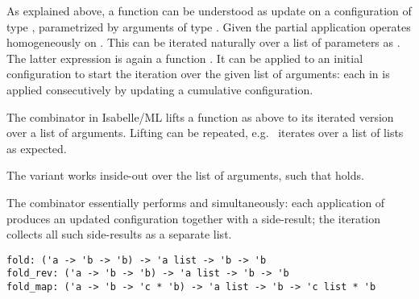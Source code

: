 \begin{isabellebody}
\begin{isamarkuptext}
\end{isamarkuptext}%
\isamarkuptrue%
%
\endisatagmlref
{\isafoldmlref}%
%
\isadelimmlref
%
\endisadelimmlref
%
\isamarkuptrue%
%
\begin{isamarkuptext}%
As explained above, a function  can be
  understood as update on a configuration of type \isa{{\isasymbeta}},
  parametrized by arguments of type \isa{{\isasymalpha}}.  Given 
  the partial application  operates
  homogeneously on \isa{{\isasymbeta}}.  This can be iterated naturally over a
  list of parameters  as .  The latter expression is again a function \isa{{\isasymbeta}\ {\isasymrightarrow}\ {\isasymbeta}}.
  It can be applied to an initial configuration  to
  start the iteration over the given list of arguments: each  in  is applied consecutively by updating a
  cumulative configuration.

  The  combinator in Isabelle/ML lifts a function  as above to its iterated version over a list of arguments.
  Lifting can be repeated, e.g.\  iterates
  over a list of lists as expected.

  The variant  works inside-out over the list of
  arguments, such that  holds.

  The  combinator essentially performs  and  simultaneously: each application of  produces an updated configuration together with a side-result;
  the iteration collects all such side-results as a separate list.%
\end{isamarkuptext}%
\isamarkuptrue%
%
\isadelimmlref
%
\endisadelimmlref
%
\isatagmlref
%
\begin{isamarkuptext}%
\begin{mldecls}
  \verb|fold: ('a -> 'b -> 'b) -> 'a list -> 'b -> 'b| \\
  \verb|fold_rev: ('a -> 'b -> 'b) -> 'a list -> 'b -> 'b| \\
  \verb|fold_map: ('a -> 'b -> 'c * 'b) -> 'a list -> 'b -> 'c list * 'b| \\
  \end{mldecls}


\end{isamarkuptext}
\end{isabellebody}
